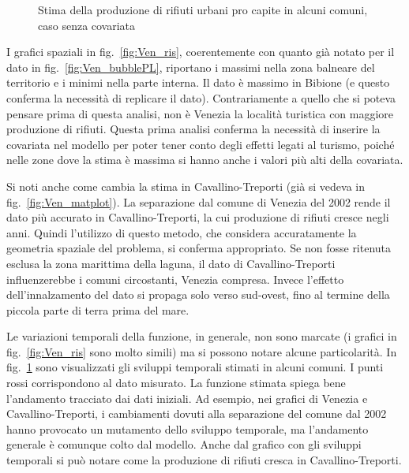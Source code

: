 \documentclass[a4paper,11pt,twoside,openright]{book}							%
\begin{document}
\begin{figure}[t]
{   }
	\caption{Stima della produzione di rifiuti urbani pro capite in alcuni comuni, caso senza covariata}
	\label{fig:Ven_tempo}
\end{figure}

I grafici spaziali in fig.~\ref{fig:Ven_ris}, coerentemente con quanto già notato per il dato in fig.~\ref{fig:Ven_bubblePL}, riportano i massimi nella zona balneare del territorio e i minimi nella parte interna. Il dato è massimo in Bibione (e questo conferma la necessità di replicare il dato). Contrariamente a quello che si poteva pensare prima di questa analisi, non è Venezia la località turistica con maggiore produzione di rifiuti. Questa prima analisi conferma la necessità di inserire la covariata nel modello per poter tener conto degli effetti legati al turismo, poiché nelle zone dove la stima è massima si hanno anche i valori più alti della covariata.

Si noti anche come cambia la stima in Cavallino-Treporti (già si vedeva in fig.~\ref{fig:Ven_matplot}). La separazione dal comune di Venezia del 2002 rende il dato più accurato in Cavallino-Treporti, la cui produzione di rifiuti cresce negli anni. Quindi l'utilizzo di questo metodo, che considera accuratamente la geometria spaziale del problema, si conferma appropriato. Se non fosse ritenuta esclusa la zona marittima della laguna, il dato di Cavallino-Treporti influenzerebbe i comuni circostanti, Venezia compresa. Invece l'effetto dell'innalzamento del dato si propaga solo verso sud-ovest, fino al termine della piccola parte di terra prima del mare.

Le variazioni temporali della funzione, in generale, non sono marcate (i grafici in fig.~\ref{fig:Ven_ris} sono molto simili) ma si possono notare alcune particolarità. In fig.~\ref{fig:Ven_tempo} sono visualizzati gli sviluppi temporali stimati in alcuni comuni. I punti rossi corrispondono al dato misurato. La funzione stimata spiega bene l'andamento tracciato dai dati iniziali. Ad esempio, nei grafici di Venezia e Cavallino-Treporti, i cambiamenti dovuti alla separazione del comune dal 2002 hanno provocato un mutamento dello sviluppo temporale, ma l'andamento generale è comunque colto dal modello. Anche dal grafico con gli sviluppi temporali si può notare come la produzione di rifiuti cresca in Cavallino-Treporti.
\end{document}
